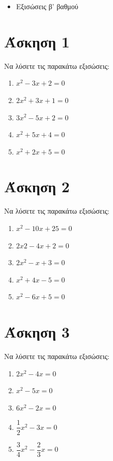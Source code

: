 \documentclass[a4paper,10pt]{report}
\begin{document}
\vspace{2em}
\begin{itemize}
\item Εξισώσεις β' βαθμού
\end{itemize}

\section*{Άσκηση 1  \hfill \small{}}
Να λύσετε τις παρακάτω εξισώσεις:
\begin{enumerate}[1)]
 \item $x^{2}-3x+2=0$ 
 \item $2x^{2}+3x+1=0$
 \item $3x^{2}-5x+2=0$
 \item $x^{2}+5x+4=0$
 \item $x^{2}+2x+5=0$
\end{enumerate}


\section*{Άσκηση 2  \hfill \small{}}
Να λύσετε τις παρακάτω εξισώσεις:
\begin{enumerate}[1)]
 \item $x^{2}-10x+25=0$
 \item $2x{2}-4x+2=0$
 \item $2x^{2}-x+3=0$
 \item $x^{2}+4x-5=0$
 \item $x^{2}-6x+5=0$
\end{enumerate}

\section*{Άσκηση 3  \hfill \small{}}
Να λύσετε τις παρακάτω εξισώσεις:
\begin{enumerate}[1)]
 \item $2x^{2}-4x=0$
 \item $x^{2}-5x=0$
 \item $6x^{2}-2x=0$
 \item $\dfrac{1}{2}x^{2}-3x=0$
 \item $\dfrac{3}{4}x^{2}-\dfrac{2}{3}x=0$
\end{enumerate}
\end{document}
